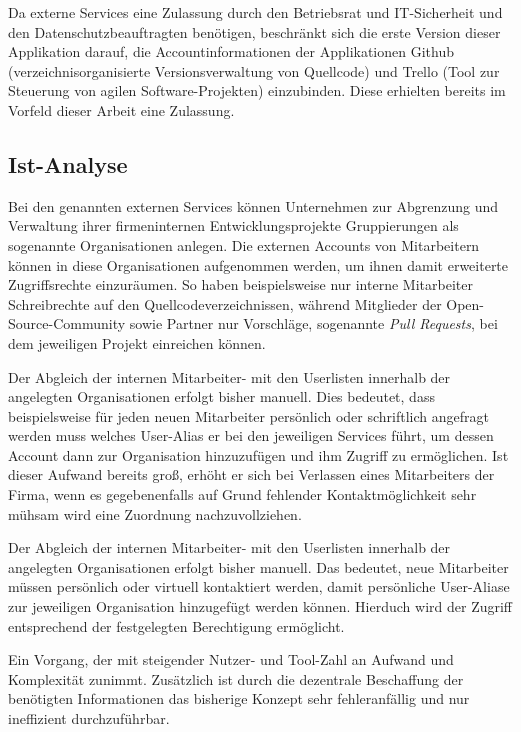Da externe Services eine Zulassung durch den Betriebsrat und IT-Sicherheit und den Datenschutzbeauftragten
benötigen, beschränkt sich die erste Version dieser Applikation darauf, die Accountinformationen der
Applikationen Github (verzeichnisorganisierte Versionsverwaltung von Quellcode) und Trello
(Tool zur Steuerung von agilen Software-Projekten) einzubinden. Diese erhielten bereits im Vorfeld
dieser Arbeit eine Zulassung.

\subsection{Ist-Analyse}
\label{sec:Ist-Analyse}
Bei den genannten externen Services können Unternehmen zur Abgrenzung und
Verwaltung ihrer firmeninternen Entwicklungsprojekte Gruppierungen als sogenannte Organisationen anlegen.
Die externen Accounts von Mitarbeitern können in diese Organisationen aufgenommen werden,
um ihnen damit erweiterte Zugriffsrechte einzuräumen.
So haben beispielsweise nur interne Mitarbeiter Schreibrechte auf den Quellcodeverzeichnissen, während
Mitglieder der Open-Source-Community sowie Partner nur Vorschläge, sogenannte
\textit{Pull Requests}, bei dem jeweiligen Projekt einreichen können.

Der Abgleich der internen Mitarbeiter- mit den Userlisten innerhalb der angelegten Organisationen
erfolgt bisher manuell. Dies bedeutet, dass beispielsweise für jeden neuen
Mitarbeiter persönlich oder schriftlich angefragt werden muss welches User-Alias er bei den
jeweiligen Services führt, um dessen Account dann zur Organisation hinzuzufügen und ihm
Zugriff zu ermöglichen. Ist dieser Aufwand bereits groß, erhöht er sich bei Verlassen eines Mitarbeiters
der Firma, wenn es gegebenenfalls auf Grund fehlender Kontaktmöglichkeit sehr mühsam wird eine Zuordnung
nachzuvollziehen.

Der Abgleich der internen Mitarbeiter- mit den Userlisten innerhalb der angelegten Organisationen
erfolgt bisher manuell. Das bedeutet, neue Mitarbeiter müssen persönlich oder virtuell
kontaktiert werden, damit persönliche User-Aliase zur jeweiligen Organisation hinzugefügt
werden können. Hierduch wird der Zugriff entsprechend der festgelegten Berechtigung ermöglicht.

Ein Vorgang, der mit steigender Nutzer- und Tool-Zahl an Aufwand und Komplexität zunimmt.
Zusätzlich ist durch die dezentrale Beschaffung der benötigten Informationen das bisherige
Konzept sehr fehleranfällig und nur ineffizient durchzuführbar.

